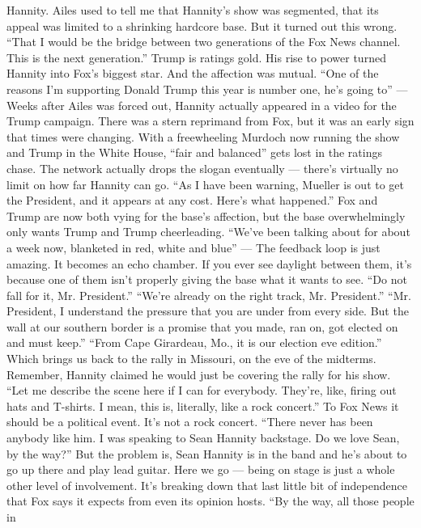 \begin{itemize}
  Hannity. Ailes used to tell me that Hannity's show was segmented, that
  its appeal was limited to a shrinking hardcore base. But it turned out
  this wrong. ``That I would be the bridge between two generations of
  the Fox News channel. This is the next generation.'' Trump is ratings
  gold. His rise to power turned Hannity into Fox's biggest star. And
  the affection was mutual. ``One of the reasons I'm supporting Donald
  Trump this year is number one, he's going to'' --- Weeks after Ailes
  was forced out, Hannity actually appeared in a video for the Trump
  campaign. There was a stern reprimand from Fox, but it was an early
  sign that times were changing. With a freewheeling Murdoch now running
  the show and Trump in the White House, ``fair and balanced'' gets lost
  in the ratings chase. The network actually drops the slogan eventually
  --- there's virtually no limit on how far Hannity can go. ``As I have
  been warning, Mueller is out to get the President, and it appears at
  any cost. Here's what happened.'' Fox and Trump are now both vying for
  the base's affection, but the base overwhelmingly only wants Trump and
  Trump cheerleading. ``We've been talking about for about a week now,
  blanketed in red, white and blue'' --- The feedback loop is just
  amazing. It becomes an echo chamber. If you ever see daylight between
  them, it's because one of them isn't properly giving the base what it
  wants to see. ``Do not fall for it, Mr. President.'' ``We're already
  on the right track, Mr. President.'' ``Mr. President, I understand the
  pressure that you are under from every side. But the wall at our
  southern border is a promise that you made, ran on, got elected on and
  must keep.'' ``From Cape Girardeau, Mo., it is our election eve
  edition.'' Which brings us back to the rally in Missouri, on the eve
  of the midterms. Remember, Hannity claimed he would just be covering
  the rally for his show. ``Let me describe the scene here if I can for
  everybody. They're, like, firing out hats and T-shirts. I mean, this
  is, literally, like a rock concert.'' To Fox News it should be a
  political event. It's not a rock concert. ``There never has been
  anybody like him. I was speaking to Sean Hannity backstage. Do we love
  Sean, by the way?'' But the problem is, Sean Hannity is in the band
  and he's about to go up there and play lead guitar. Here we go ---
  being on stage is just a whole other level of involvement. It's
  breaking down that last little bit of independence that Fox says it
  expects from even its opinion hosts. ``By the way, all those people in

\end{itemize}
